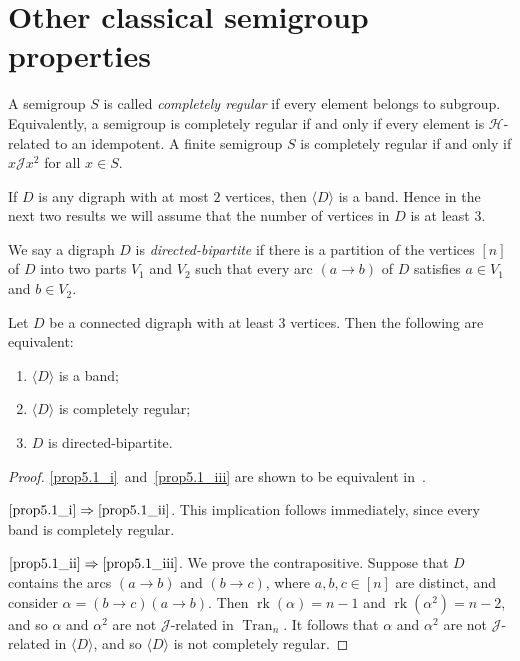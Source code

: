 \documentclass[ALCO,ThmDefs,Unicode,epreuves]{cedram}
\DeclareMathOperator{\Tran}{Tran}
\DeclareMathOperator{\rk}{rk}
\newcommand{\genset}[1]{\langle#1\rangle}
\newcommand{\J}{\mathcal{J}}
\newcommand{\Hcal}{\mathcal{H}}
\newcommand{\nset}{[n]}
\begin{document}
\section{Other classical semigroup properties} \label{sec:properties}
A semigroup $S$ is called \emph{completely regular} if every element belongs
to subgroup. Equivalently, a semigroup is completely regular if and only if
every element is $\Hcal$-related to an idempotent. A finite semigroup $S$ is
completely regular if and only if $x\J x^2$ for all $x\in S$. 

If $D$ is any digraph with at most $2$ vertices, then $\genset{D}$ is a band.
Hence in the next two results we will assume that the number of vertices in $D$
is at least $3$.

We say a digraph $D$ is \emph{directed-bipartite} if there is a partition
of the vertices $\nset$ of $D$ into two parts $V_1$ and $V_2$ such
that every arc $(a\to b)$ of $D$ satisfies $a \in V_1$ and $b \in V_2$.

\goodbreak\begin{proposition} \label{prop:completely_regular}
 Let $D$ be a connected digraph with at least $3$ vertices. 
 Then the following are equivalent:
 \begin{enumerate}[(\roman*)]

 \item\label{prop5.1_i}
 $\genset{D}$ is a band;

 \item\label{prop5.1_ii}
 $\genset{D}$ is completely regular;

 \item\label{prop5.1_iii} 
 $D$ is directed-bipartite.
 \end{enumerate}
\end{proposition}

\begin{proof}
 \ref{prop5.1_i}~and~\ref{prop5.1_iii} are shown to be equivalent in~\cite[Theorem~2.12]{Cameron2016aa}.

 $\ref{prop5.1_i}\Rightarrow\ref{prop5.1_ii}$. This implication follows
 immediately, since every band is completely regular.

$\ref{prop5.1_ii}\Rightarrow\ref{prop5.1_iii}$. We prove the contrapositive. Suppose that $D$
 contains the arcs $(a\to b)$ and $(b\to c)$, where $a,b,c\in\nset$
 are distinct, and consider $\alpha=(b\to c)(a\to b)$. Then $\rk(\alpha)=n-1$
 and $\rk(\alpha^2)=n-2$, and so $\alpha$ and $\alpha^2$ are not $\J$-related
 in $\Tran_n$. It follows that $\alpha$ and $\alpha^2$ are not $\J$-related in
 $\genset{D}$, and so $\genset{D}$ is not completely regular.
\end{proof}
\end{document}
